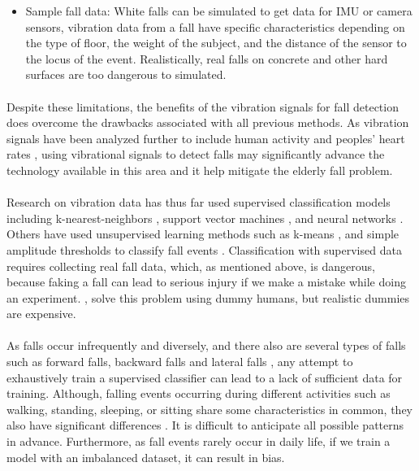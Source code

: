 \begin{enumerate}
\begin{itemize}
\item Sample fall data: White falls can be simulated to get data for IMU or camera sensors, vibration data from a fall have specific characteristics depending on the type of floor, the weight of the subject, and the distance of the sensor to the locus of the event. Realistically, real falls on concrete and other hard surfaces are too dangerous to simulated.
\end{itemize}
\end{enumerate}

\paragraph{}
Despite these limitations, the benefits of the vibration signals for fall detection does overcome the drawbacks associated with all previous methods. As vibration signals have been analyzed further to include human activity and peoples’ heart rates \cite{jia_howard_zhang_zhang_2017}, using vibrational signals to detect falls may significantly advance the technology available in this area and it help mitigate the elderly fall problem.

\paragraph{}
Research on vibration data has thus far used supervised classification models including k-nearest-neighbors \cite{shao_wang_song_ilyas_guo_chang_2020}, support vector machines \cite{wang_chen_zhou_sun_dong_2015, kasturi_jo_2017,liu_jiang_su_benzoni_maxwell_2019}, and neural networks \cite{sultana_deb_dhar_koshiba_2021}. Others have used unsupervised learning methods such as k-means \cite{shao_wang_song_ilyas_guo_chang_2020}, and simple amplitude thresholds to classify fall events \cite{alwan_rajendran_kell_mack_dalal_wolfe_felder_2006,charlon_bourennane_bettahar_campo_2013,britto_filho_lubaszewski_2020}. Classification with supervised data requires collecting real fall data, which, as mentioned above, is dangerous, because faking a fall can lead to serious injury if we make a mistake while doing an experiment. \citeauthor{liu_jiang_su_benzoni_maxwell_2019}, \citeyear{liu_jiang_su_benzoni_maxwell_2019} solve this problem using dummy humans, but realistic dummies are expensive.

\paragraph{}
As falls occur infrequently and diversely, and there also are several types of falls such as forward falls, backward falls and lateral falls \cite{el-bendary_tan_c_pivot_lam_2013}, any attempt to exhaustively train a supervised classifier can lead to a lack of sufficient data for training. Although, falling events occurring during different activities such as walking, standing, sleeping, or sitting share some characteristics in common, they also have significant differences \cite{wang_ellul_azzopardi_2020}. It is difficult to anticipate all possible patterns in advance. Furthermore, as fall events rarely occur in daily life, if we train a model with an imbalanced dataset, it can result in bias.

